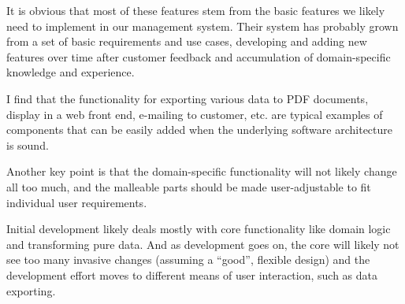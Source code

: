 It is obvious that most of these features stem from the basic features we
likely need to implement in our management system.
Their system has probably grown from a set of basic requirements and use cases,
developing and adding new features over time after customer feedback and
accumulation of domain-specific knowledge and experience.

I find that the functionality for exporting various data to PDF documents,
display in a web front end, e-mailing to customer, etc. are typical examples of
components that can be easily added when the underlying software architecture
is sound.

Another key point is that the domain-specific functionality will not likely
change all too much, and the malleable parts should be made user-adjustable to
fit individual user requirements.

Initial development likely deals mostly with core functionality like domain
logic and transforming pure data. And as development goes on, the core will
likely not see too many invasive changes (assuming a ``good'', flexible design)
and the development effort moves to different means of user interaction, such
as data exporting.

